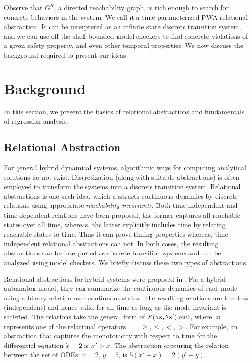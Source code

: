 Observe that $G^R$, a directed reachability graph, is rich enough to
search for concrete behaviors in the system. We call it a time
parameterized PWA relational abstraction. It can be interpreted as an
infinite state discrete transition system, and we can use
off-the-shelf bounded model checkers to find concrete violations of a
given safety property, and even other temporal properties.  We now
discuss the background required to present our ideas.

\section{Background}

In this section, we present the basics of relational abstractions and
fundamentals of regression analysis.

\subsection{Relational Abstraction}

For general hybrid dynamical systems, algorithmic ways for computing
analytical solutions do not exist. Discretization (along with suitable
abstractions) is often employed to transform the systems into a
discrete transition system. Relational abstractions is one such idea,
which abstracts continuous dynamics by discrete relations using
appropriate \textit{reachability invariants}. Both time independent
and time dependent relations have been proposed; the former captures
all reachable states over all time, whereas, the latter explicitly
includes time by relating reachable states to time. Thus it
can prove timing properties whereas, time independent relational
abstractions can not. In both cases, the resulting abstractions can be
interpreted as discrete transition systems and can be analyzed using
model checkers. We briefly discuss these two types of abstractions.


Relational abstractions for hybrid systems were proposed in
\cite{Sankaranarayanan+Tiwari/2011/Relational}. For a hybrid automaton
model, they can summarize the continuous dynamics of each mode using a
binary relation over continuous states. The resulting relations are
timeless (independent) and hence valid for all time as long as
the mode invariant is satisfied. The relations take the general form
of $R(\x,\x') \bowtie 0$, where $\bowtie$ represents one of the
relational operators $=, \ge, \le, <, >$. For example, an abstraction
that captures the monotonicity with respect to time for the
differential equation $\dot{x} = 2$ is $x' > x$. The abstraction
capturing the relation between the set of ODEs: $\dot{x} = 2$,
$\dot{y} = 5$, is $5(x' - x) = 2(y' - y)$.

